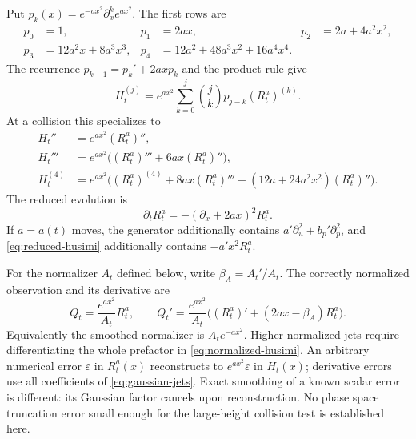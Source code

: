 \documentclass[11pt]{article}
\numberwithin{equation}{section}
\theoremstyle{definition}
\theoremstyle{remark}
\begin{document}
Put $p_k(x)=e^{-ax^2}\partial_x^ke^{ax^2}$. The first rows are
\begin{align}
 p_0&=1,&p_1&=2ax,&p_2&=2a+4a^2x^2,\\
 p_3&=12a^2x+8a^3x^3,&
 p_4&=12a^2+48a^3x^2+16a^4x^4.\nonumber
\end{align}
The recurrence $p_{k+1}=p_k'+2axp_k$ and the product rule give
\begin{equation}
 H_t^{(j)}=e^{ax^2}\sum_{k=0}^j\binom jk p_{j-k}(R_t^a)^{(k)}.
 \label{eq:gaussian-jets}
\end{equation}
At a collision this specializes to
\begin{align}
 H_t''&=e^{ax^2}(R_t^a)'',\nonumber\\
 H_t'''&=e^{ax^2}\bigl((R_t^a)'''+6ax(R_t^a)''\bigr),\\
 H_t^{(4)}&=e^{ax^2}\bigl((R_t^a)^{(4)}+8ax(R_t^a)'''
                  +(12a+24a^2x^2)(R_t^a)''\bigr).\nonumber
\end{align}
The reduced evolution is
\begin{equation}
 \partial_tR_t^a=-(\partial_x+2ax)^2R_t^a.
 \label{eq:reduced-husimi}
\end{equation}
If $a=a(t)$ moves, the generator additionally contains
$a'\partial_u^2+b_p'\partial_p^2$, and
\eqref{eq:reduced-husimi} additionally contains $-a'x^2R_t^a$.

For the normalizer $A_t$ defined below, write $\beta_A=A_t'/A_t$.
The correctly normalized observation and its derivative are
\begin{equation}
 Q_t=\frac{e^{ax^2}}{A_t}R_t^a,\qquad
 Q_t'=\frac{e^{ax^2}}{A_t}\bigl((R_t^a)'+(2ax-\beta_A)R_t^a\bigr).
 \label{eq:normalized-husimi}
\end{equation}
Equivalently the smoothed normalizer is $A_te^{-ax^2}$. Higher normalized
jets require differentiating the whole prefactor in
\eqref{eq:normalized-husimi}. An arbitrary numerical error $\varepsilon$
in $R_t^a(x)$ reconstructs to $e^{ax^2}\varepsilon$ in $H_t(x)$;
derivative errors use all coefficients of \eqref{eq:gaussian-jets}.
Exact smoothing of a known scalar error is different: its Gaussian
factor cancels upon reconstruction. No phase space truncation error
small enough for the large-height collision test is established here.
\end{document}
